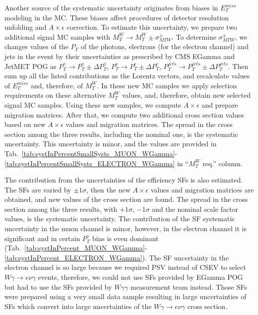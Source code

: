 
Another source of the systematic uncertainty originates from biases in $E_T^{miss}$ modeling in the MC. These biases affect procedures of detector resolution unfolding and $A\times\epsilon$ correction. To estimate this uncertainty, we prepare two additional signal MC samples with $M_T^{W} \rightarrow M_T^W \pm \sigma^{\pm}_{MTW}$. To determine $\sigma^{\pm}_{MTW}$, we changes values of the $P_T$ of the photons, electrons (for the electron channel) and jets in the event by their uncertainties as prescribed by CMS EGamma and JetMET POG as $P_T^{\gamma}\rightarrow P_T^{\gamma} \pm \Delta P_T^{\gamma}$, $P_T^{e}\rightarrow P_T^{e} \pm \Delta P_T^{e}$, $P_T^{jets}\rightarrow P_T^{jets} \pm \Delta P_T^{jets}$. Then sum up all the listed contributions as the Lorentz vectors, and recalculate values of $E_T^{miss}$ and, therefore, of $M_T^{W}$. In these new MC samples we apply selection requirements on these alternative $M_T^W$ values, and, therefore, obtain new selected signal MC samples. Using these new samples, we compute $A \times \epsilon$ and prepare migration matrices. After that, we compute two additional cross section values based on new $A\times\epsilon$ values and migration matrices. The spread in the cross section among the three results, including the nominal one, is the systematic uncertainty. This uncertainty is minor, and the values are provided in Tab.~\ref{tab:systInPercentSmallSysts_MUON_WGamma}-\ref{tab:systInPercentSmallSysts_ELECTRON_WGamma} in ``$M_T^W$ req.'' column.


The contribution from the uncertainties of the efficiency SFs is also estimated. The SFs are varied by $\pm 1\sigma$, then the new $A \times \epsilon$ values and migration matrices are obtained, and new values of the cross section are found. The spread in the cross section among the three results, with $+1\sigma$, $-1\sigma$ and the nominal scale factor values, is the systematic uncertainty. The contribution of the SF systematic uncertainty in the muon channel is minor, however, in the electron channel it is significant and in certain $P_T^{\gamma}$ bins is even dominant (Tab.~\ref{tab:systInPercent_MUON_WGamma}-\ref{tab:systInPercent_ELECTRON_WGamma}). The SF uncertainty in the electron channel is so large because we required PSV instead of CSEV to select $W\gamma\rightarrow e\nu\gamma$ events, therefore, we could not use SFs provided by EGamma POG but had to use the SFs provided by $W\gamma\gamma$ measurement team instead. Those SFs were prepared using a very small data sample resulting in large uncertainties of SFs which convert into large uncertainties of the $W\gamma\rightarrow e\nu\gamma$ cross section. 

